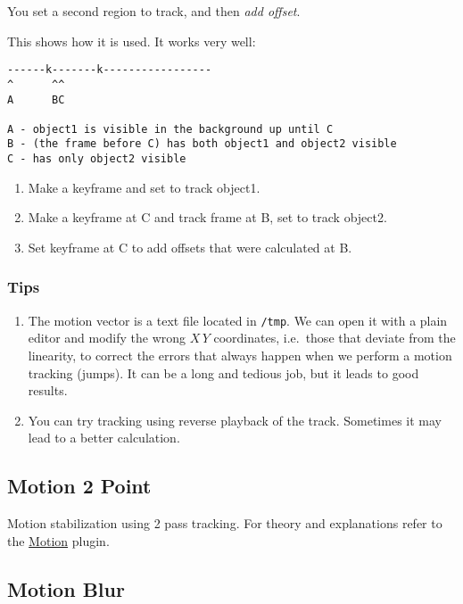 You set a second region to track, and then \textit{add offset}.

This shows how it is used.  It works very well:

\begin{verbatim}
------k-------k-----------------
^      ^^
A      BC

A - object1 is visible in the background up until C
B - (the frame before C) has both object1 and object2 visible
C - has only object2 visible
\end{verbatim}

\begin{enumerate}
    \item Make a keyframe and set to track object1.
    \item Make a keyframe at C and track frame at B, set to track object2.
    \item Set keyframe at C to add offsets that were calculated at B.
\end{enumerate}

\subsubsection*{Tips}
\label{ssub:tips}

\begin{enumerate}
    \item The motion vector is a text file located in \texttt{/tmp}. We can open it with a plain editor and modify the wrong $X\,Y$ coordinates, i.e.\ those that deviate from the linearity, to correct the errors that always happen when we perform a motion tracking (jumps). It can be a long and tedious job, but it leads to good results.
    \item You can try tracking using reverse playback of the track. Sometimes it may lead to a better calculation.
\end{enumerate}

\subsection{Motion 2 Point}%
\label{sub:motion_2_point}

Motion stabilization using 2 pass tracking. For theory and explanations refer to the \hyperref[sub:motion]{Motion} plugin.

\subsection{Motion Blur}%
\label{sub:motion_blur}

